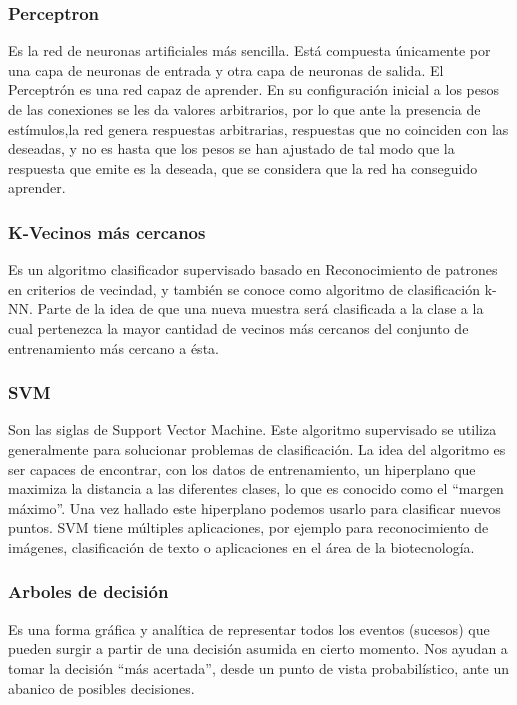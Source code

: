\documentclass[a4paper]{article}
\begin{document}
\subsubsection*{Perceptron}
Es la red de neuronas artificiales más sencilla. Está compuesta únicamente por una capa de neuronas de entrada y otra capa de neuronas de salida. El Perceptrón es una red capaz de aprender. En su configuración inicial a los pesos de las conexiones se les da valores arbitrarios, por lo que ante la presencia de estímulos,la red genera respuestas arbitrarias, respuestas que no coinciden con las deseadas, y no es hasta que los pesos se han ajustado de tal modo que la respuesta que emite es la deseada, que se considera que la red ha conseguido aprender.

\subsubsection*{K-Vecinos m\'as cercanos}
Es un algoritmo clasificador supervisado basado en Reconocimiento de patrones en criterios de vecindad, y también se conoce como algoritmo de clasificación k-NN. Parte de la idea de que una nueva muestra será clasificada a la clase a la cual pertenezca la mayor cantidad de vecinos más cercanos del conjunto de entrenamiento más cercano a ésta.

\subsubsection*{SVM}
Son las siglas de Support Vector Machine. Este algoritmo supervisado se utiliza generalmente para solucionar problemas de clasificación. La idea del algoritmo es ser capaces de encontrar, con los datos de entrenamiento, un hiperplano que maximiza la distancia a las diferentes clases, lo que es conocido como el “margen máximo”.
Una vez hallado este hiperplano podemos usarlo para clasificar nuevos puntos.
SVM tiene múltiples aplicaciones, por ejemplo para reconocimiento de imágenes, clasificación de texto o aplicaciones en el área de la biotecnología.

\subsubsection*{Arboles de decisión}
Es una forma gráfica y analítica de representar todos los eventos (sucesos) que
pueden surgir a partir de una decisión asumida en cierto momento. Nos ayudan a tomar la decisión “más acertada”, desde un punto de vista probabilístico, ante un
abanico de posibles decisiones.
\end{document}
